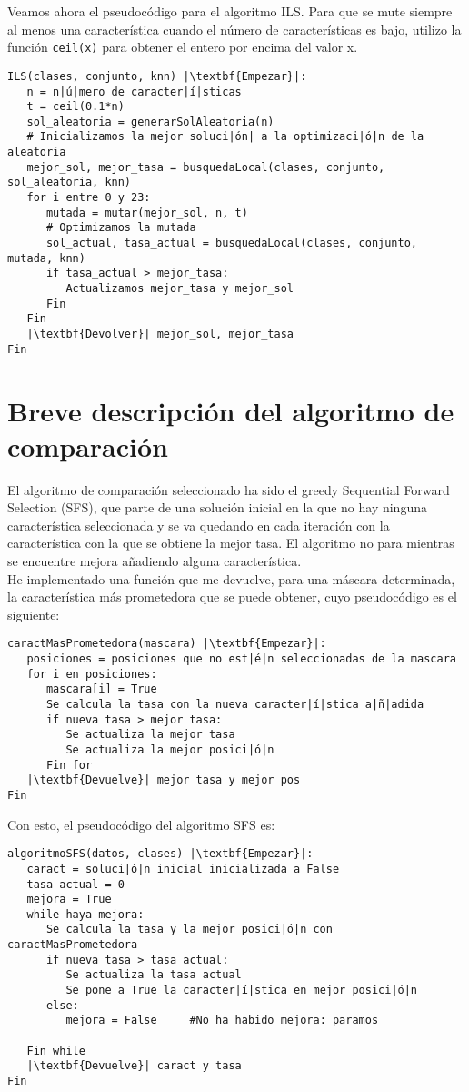 \documentclass[12pt]{article}
\begin{document}
Veamos ahora el pseudocódigo para el algoritmo ILS. Para que se mute siempre al menos una característica cuando el número de características es bajo, utilizo la función \texttt{ceil(x)} para obtener el entero por encima del valor x.
\begin{lstlisting}
ILS(clases, conjunto, knn) |\textbf{Empezar}|:
   n = n|ú|mero de caracter|í|sticas
   t = ceil(0.1*n)
   sol_aleatoria = generarSolAleatoria(n)
   # Inicializamos la mejor soluci|ón| a la optimizaci|ó|n de la aleatoria 
   mejor_sol, mejor_tasa = busquedaLocal(clases, conjunto, sol_aleatoria, knn)
   for i entre 0 y 23:
      mutada = mutar(mejor_sol, n, t)
      # Optimizamos la mutada
      sol_actual, tasa_actual = busquedaLocal(clases, conjunto, mutada, knn)
      if tasa_actual > mejor_tasa:
         Actualizamos mejor_tasa y mejor_sol
      Fin
   Fin
   |\textbf{Devolver}| mejor_sol, mejor_tasa
Fin

\end{lstlisting}

\newpage

\section{Breve descripción del algoritmo de comparación}
El algoritmo de comparación seleccionado ha sido el greedy Sequential Forward Selection (SFS), que parte de una solución inicial en la que no hay ninguna característica seleccionada y se va quedando en cada iteración con la característica con la que se obtiene la mejor tasa. El algoritmo no para mientras se encuentre mejora añadiendo alguna característica.\\
He implementado una función que me devuelve, para una máscara determinada, la característica más prometedora que se puede obtener, cuyo pseudocódigo es el siguiente:
\begin{lstlisting}
caractMasPrometedora(mascara) |\textbf{Empezar}|:
   posiciones = posiciones que no est|é|n seleccionadas de la mascara
   for i en posiciones:
      mascara[i] = True
      Se calcula la tasa con la nueva caracter|í|stica a|ñ|adida
      if nueva tasa > mejor tasa:
         Se actualiza la mejor tasa
         Se actualiza la mejor posici|ó|n
      Fin for
   |\textbf{Devuelve}| mejor tasa y mejor pos
Fin
\end{lstlisting}

Con esto, el pseudocódigo del algoritmo SFS es:
\begin{lstlisting}
algoritmoSFS(datos, clases) |\textbf{Empezar}|:
   caract = soluci|ó|n inicial inicializada a False
   tasa actual = 0
   mejora = True
   while haya mejora:
      Se calcula la tasa y la mejor posici|ó|n con caractMasPrometedora
      if nueva tasa > tasa actual:
         Se actualiza la tasa actual
         Se pone a True la caracter|í|stica en mejor posici|ó|n
      else:
         mejora = False		#No ha habido mejora: paramos
      
   Fin while
   |\textbf{Devuelve}| caract y tasa
Fin

\end{lstlisting}
\end{document}
